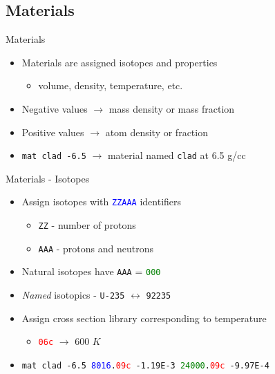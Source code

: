 \documentclass{beamer}
\begin{document}
\subsection{Materials}

\begin{frame}{Materials}
    \begin{itemize}
        \item Materials are assigned isotopes and properties
        \begin{itemize}
            \item volume, density, temperature, etc.
        \end{itemize}
        \item{Negative values $\rightarrow$ mass density or mass fraction}
        \item{Positive values $\rightarrow$ atom density or fraction}
        \item{\texttt{mat clad -6.5} $\rightarrow$ material named \texttt{clad} at 6.5 g/cc}
    \end{itemize}
\end{frame}

\begin{frame}{Materials - Isotopes}
    \begin{itemize}
        \item{Assign isotopes with \textcolor{blue}{\texttt{ZZAAA}} identifiers}
        \begin{itemize}
            \item{\texttt{ZZ} - number of protons}
            \item{\texttt{AAA} - protons and neutrons}
        \end{itemize}
        \item{Natural isotopes have \texttt{AAA} = \textcolor{green}{\texttt{000}}}
        \item{\textit{Named} isotopics - \texttt{U-235} $\leftrightarrow$ \texttt{92235}}
        \item{Assign cross section library corresponding to temperature}
        \begin{itemize}
            \item{\textcolor{red}{\texttt{06c}} $\rightarrow$ 600 $K$}
        \end{itemize}
        \item{\texttt{mat clad -6.5 \textcolor{blue}{8016}.\textcolor{red}{09c} -1.19E-3
            \textcolor{green}{24000}.\textcolor{red}{09c} -9.97E-4}}
    \end{itemize}
\end{frame}
\end{document}
